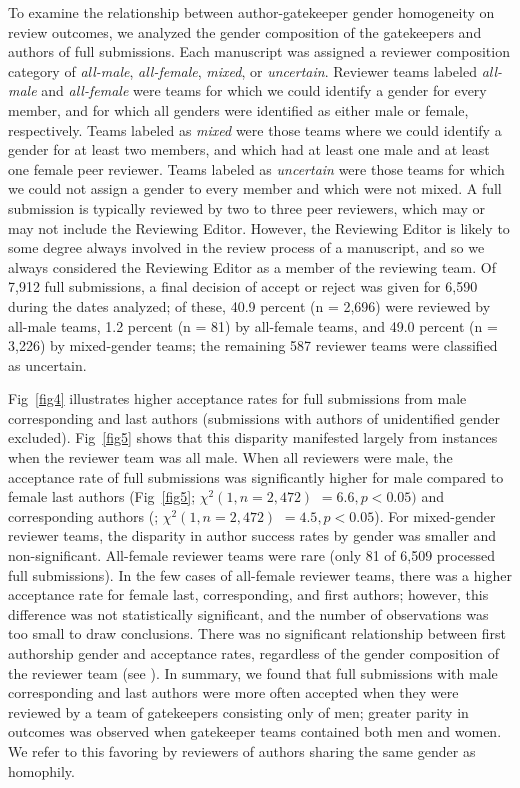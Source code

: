 \documentclass[10pt,letterpaper]{article}
\begin{document}
To examine the relationship between author-gatekeeper gender homogeneity on review outcomes, we analyzed the gender composition of the gatekeepers and authors of full submissions. Each manuscript was assigned a reviewer composition category of \textit{all-male}, \textit{all-female}, \textit{mixed}, or \textit{uncertain}. Reviewer teams labeled \textit{all-male} and \textit{all-female} were teams for which we could identify a gender for every member, and for which all genders were identified as either male or female, respectively. Teams labeled as \textit{mixed} were those teams where we could identify a gender for at least two members, and which had at least one male and at least one female peer reviewer. Teams labeled as \textit{uncertain} were those teams for which we could not assign a gender to every member and which were not mixed. A full submission is typically reviewed by two to three peer reviewers, which may or may not include the Reviewing Editor. However, the Reviewing Editor is likely to some degree always involved in the review process of a manuscript, and so we always considered the Reviewing Editor as a member of the reviewing team. Of 7,912 full submissions, a final decision of accept or reject was given for 6,590 during the dates analyzed; of these, 40.9 percent (n = 2,696) were reviewed by all-male teams, 1.2 percent (n = 81) by all-female teams, and 49.0 percent (n = 3,226) by mixed-gender teams; the remaining 587 reviewer teams were classified as uncertain.

Fig~\ref{fig4} illustrates higher acceptance rates for full submissions from male corresponding and last authors (submissions with authors of unidentified gender excluded). Fig~\ref{fig5} shows that this disparity manifested largely from instances when the reviewer team was all male. When all reviewers were male, the acceptance rate of full submissions was significantly higher for male compared to female last authors (Fig~\ref{fig5}; $\chi^{2} (1, n = 2,472)$ $= 6.6, p < 0.05)$ and corresponding authors (; $\chi^{2} (1, n = 2,472)$ $= 4.5, p < 0.05$). For mixed-gender reviewer teams, the disparity in author success rates by gender was smaller and non-significant. All-female reviewer teams were rare (only 81 of 6,509 processed full submissions). In the few cases of all-female reviewer teams, there was a higher acceptance rate for female last, corresponding, and first authors; however, this difference was not statistically significant, and the number of observations was too small to draw conclusions. There was no significant relationship between first authorship gender and acceptance rates, regardless of the gender composition of the reviewer team (see ). In summary, we found that full submissions with male corresponding and last authors were more often accepted when they were reviewed by a team of gatekeepers consisting only of men; greater parity in outcomes was observed when gatekeeper teams contained both men and women. We refer to this favoring by reviewers of authors sharing the same gender as homophily.
\end{document}
